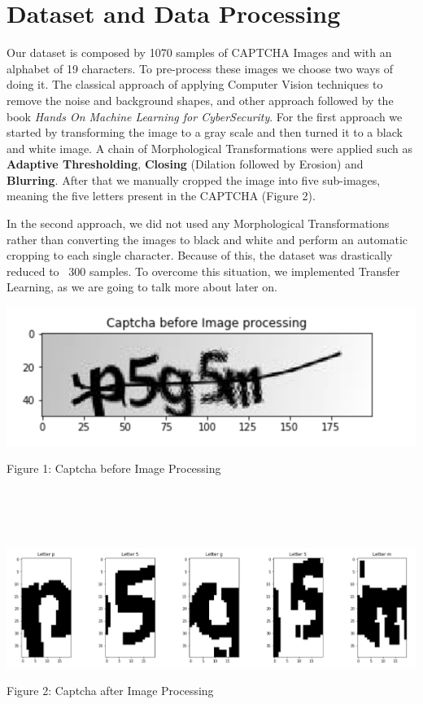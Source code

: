 \documentclass[conference]{IEEEtran}
\begin{document}
\section{Dataset and Data Processing} 
Our dataset is composed by 1070 samples of CAPTCHA Images and with an alphabet of 19 characters. To pre-process these images we choose two ways of doing it. The classical approach of applying Computer Vision techniques to remove the noise and background shapes, and other approach followed by the book \textit{Hands On Machine Learning for CyberSecurity}. For the first approach we started by transforming the image to a gray scale and then turned it to a black and white image. A chain of Morphological Transformations were applied such as \textbf{Adaptive Thresholding}, \textbf{Closing} (Dilation followed by Erosion) and \textbf{Blurring}. After that we manually cropped the image into five sub-images, meaning the five letters present in the CAPTCHA (Figure 2).
\par In the second approach, we did not used any Morphological Transformations rather than converting the images to black and white and perform an automatic cropping to each single character. Because of this, the dataset was drastically reduced to ~300 samples. To overcome this situation, we implemented Transfer Learning, as we are going to talk more  about later on. 

\begin{center}
\includegraphics[scale=0.55]{Screenshot 2021-06-30 at 21.20.40.png}
\caption{Figure 1: Captcha before Image Processing}
\end{center}
\\ \\ \\
\begin{center}
\includegraphics[scale=0.20]{Screenshot 2021-06-30 at 21.29.42.png}

\caption{Figure 2: Captcha after Image Processing}
\end{center}
\par
\end{document}
